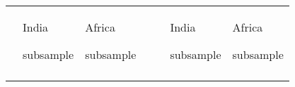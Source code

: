 \begin{tabular}{l >{\centering}p{1.5cm} >{\centering\arraybackslash}p{1.5cm} p{0.1cm} l >{\centering}p{1.5cm}>{\centering\arraybackslash}p{1.5cm}}
\hline \addlinespace[3mm]
 & India \par subsample & Africa \par subsample && & India \par subsample & Africa \par subsample \\\addlinespace[1pt]
\hline
\addlinespace[4pt]
\hline \end{tabular}
